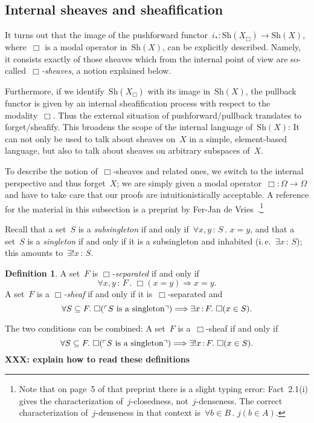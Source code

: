 \documentclass[10pt]{amsart}
\makeatletter
\theoremstyle{definition}
\newtheorem{defn}{Definition}[section]
\theoremstyle{plain}
\theoremstyle{remark}
\newcommand{\Sh}{\mathrm{Sh}}
\newcommand{\?}{\,{:}\,}
\renewcommand{\_}{\mathpunct{.}\,}
\newcommand{\speak}[1]{\ulcorner\text{\textnormal{#1}}\urcorner}
\newcommand{\ie}{i.\,e.\@\xspace}
\newcommand{\XXX}[1]{\textbf{XXX: #1}}
\makeatother
\begin{document}
\subsection{Internal sheaves and sheafification}\label{sect:internal-sheaves}
It turns out that the image of
the pushforward functor~$i_* : \Sh(X_\Box) \to \Sh(X)$, where~$\Box$ is a modal
operator in~$\Sh(X)$, can be explicitly described. Namely, it consists exactly
of those sheaves which from the internal point of view
are so-called~\emph{$\Box$-sheaves}, a notion explained below.

Furthermore, if we identify~$\Sh(X_\Box)$ with its image in~$\Sh(X)$, the
pullback functor is given by an internal sheafification process with respect to
the modality~$\Box$. Thus the external situation of pushforward/pullback
translates to forget/sheafify. This broadens the scope of the internal
language of~$\Sh(X)$: It can not only be used to talk about sheaves on~$X$ in a simple,
element-based language, but also to talk about sheaves on arbitrary subspaces
of~$X$.

To describe the notion of~$\Box$-sheaves and related ones, we switch to the internal
perspective and thus forget~$X$; we are simply given a modal operator~$\Box :
\Omega \to \Omega$ and have to take care that our proofs are intuitionistically acceptable. A
reference for the material in this subsection is a preprint by Fer-Jan de
Vries~\cite{vries:sheafification}.\footnote{Note that on page~5 of that
preprint there is a slight typing error: Fact~2.1(i) gives the
characterization of~$j$-closedness, not~$j$-denseness. The correct
characterization of~$j$-denseness in that context is~$\forall b \in B\_ j(b \in
A)$.}

Recall that a set~$S$ is a \emph{subsingleton} if and only if~$\forall x,y\?S\_
x = y$, and that a set~$S$ is a \emph{singleton} if and only if it is a subsingleton and
inhabited (\ie~$\exists x\?S$); this amounts to~$\exists!x\?S$.

\begin{defn}\label{defn:box-sheaves}
A set~$F$ is \emph{$\Box$-separated} if and only if
\[ \forall x,y\?F\_ \Box(x = y) \Longrightarrow x = y. \]
A set~$F$ is a \emph{$\Box$-sheaf} if and only if it is~$\Box$-separated and
\[ \forall S \subseteq F\_
  \Box(\speak{$S$ is a singleton}) \Longrightarrow
  \exists x\?F\_ \Box(x \in S). \]
\end{defn}

The two conditions can be combined: A set~$F$ is a~$\Box$-sheaf if and only if
\[ \forall S \subseteq F\_
  \Box(\speak{$S$ is a singleton}) \Longrightarrow
  \exists! x\?F\_ \Box(x \in S). \]
\XXX{explain how to read these definitions}
\end{document}
